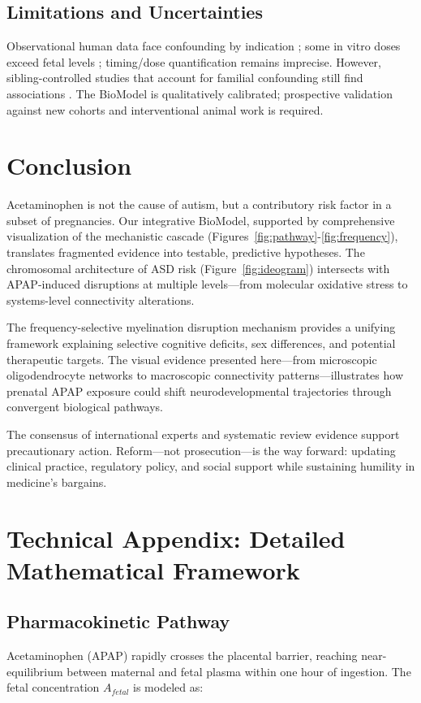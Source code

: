 \documentclass[12pt]{article}
\begin{document}
\subsection{Limitations and Uncertainties}
Observational human data face confounding by indication \citep{liew2016}; some in vitro doses exceed fetal levels \citep{perez2012}; timing/dose quantification remains imprecise. However, sibling-controlled studies that account for familial confounding still find associations \citep{brandlistuen2013,stergiakouli2016}. The BioModel is qualitatively calibrated; prospective validation against new cohorts and interventional animal work is required.

\section{Conclusion}
Acetaminophen is not the cause of autism, but a contributory risk factor in a subset of pregnancies. Our integrative BioModel, supported by comprehensive visualization of the mechanistic cascade (Figures~\ref{fig:pathway}-\ref{fig:frequency}), translates fragmented evidence into testable, predictive hypotheses. The chromosomal architecture of ASD risk (Figure~\ref{fig:ideogram}) intersects with APAP-induced disruptions at multiple levels—from molecular oxidative stress to systems-level connectivity alterations.

The frequency-selective myelination disruption mechanism provides a unifying framework explaining selective cognitive deficits, sex differences, and potential therapeutic targets. The visual evidence presented here—from microscopic oligodendrocyte networks to macroscopic connectivity patterns—illustrates how prenatal APAP exposure could shift neurodevelopmental trajectories through convergent biological pathways.

The consensus of international experts \citep{bauer2021} and systematic review evidence \citep{navarro2025,masarwa2018} support precautionary action. Reform---not prosecution---is the way forward: updating clinical practice, regulatory policy, and social support while sustaining humility in medicine's bargains.

\appendix

\section{Technical Appendix: Detailed Mathematical Framework}

\subsection{Pharmacokinetic Pathway}
Acetaminophen (APAP) rapidly crosses the placental barrier, reaching near-equilibrium between maternal and fetal plasma within one hour of ingestion. The fetal concentration $A_{fetal}$ is modeled as:
\end{document}
